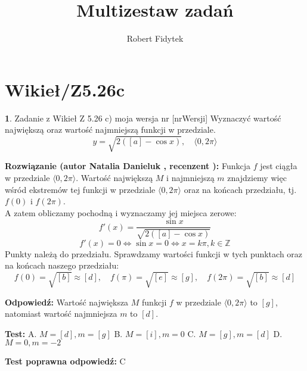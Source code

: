 \documentclass[12pt, a4paper]{article}
\title{Multizestaw zadań}
\author{Robert Fidytek}
\date{}
\theoremstyle{definition} %
\newtheorem{zad}{}
\newcommand{\kategoria}[1]{\section{#1}} %
\newcommand{\zadStart}[1]{\begin{zad}#1\newline} %
\newcommand{\zadStop}{\end{zad}}   %
\newcommand{\rozwStart}[2]{\noindent \textbf{Rozwiązanie (autor #1 , recenzent #2): }\newline} %
\newcommand{\rozwStop}{\newline}                                            %
\newcommand{\odpStart}{\noindent \textbf{Odpowiedź:}\newline}    %
\newcommand{\odpStop}{\newline}                                             %
\newcommand{\testStart}{\noindent \textbf{Test:}\newline} %
\newcommand{\testStop}{\newline} %
\newcommand{\kluczStart}{\noindent \textbf{Test poprawna odpowiedź:}\newline} %
\newcommand{\kluczStop}{\newline} %
\begin{document}
\maketitle

\kategoria{Wikieł/Z5.26c}

\zadStart{Zadanie z Wikieł Z 5.26 c) moja wersja nr [nrWersji]}
Wyznaczyć wartość największą oraz wartość najmniejszą funkcji w przedziale. 
$$y = \sqrt{2([a]-\cos x)}, \quad \langle0,2\pi\rangle$$
\zadStop

\rozwStart{Natalia Danieluk}{}
Funkcja $f$ jest ciągła w przedziale $\langle0,2\pi\rangle$. Wartość największą $M$ i najmniejszą $m$ znajdziemy więc wśród ekstremów tej funkcji w przedziale $\langle0,2\pi\rangle$ oraz na końcach przedziału, tj. $f(0)$ i $f(2\pi)$. \\
A zatem obliczamy pochodną i wyznaczamy jej miejsca zerowe:
$$ f'(x) = \frac{\sin x}{\sqrt{2([a]-\cos x)}} $$
$$ f'(x) = 0 \Leftrightarrow \sin x = 0 \Leftrightarrow x = k\pi, k \in \mathbb{Z} $$ 
Punkty należą do przedziału. Sprawdzamy wartości funkcji w tych punktach oraz na końcach naszego przedziału: \\
$$ f(0) = \sqrt{[b]} \approx [d],\quad f(\pi) = \sqrt{[e]} \approx [g],\quad f(2\pi) = \sqrt{[b]} \approx [d] $$
\rozwStop

\odpStart
Wartość największa $M$ funkcji $f$ w przedziale $\langle0,2\pi\rangle$ to $[g]$, natomiast wartość najmniejsza $m$ to $[d]$.
\odpStop

\testStart
A. $M=[d], m=[g]$
B. $M=[i], m=0$
C. $M=[g], m=[d]$
D. $M=0, m=-2$
\testStop

\kluczStart
C
\kluczStop
\end{document}
